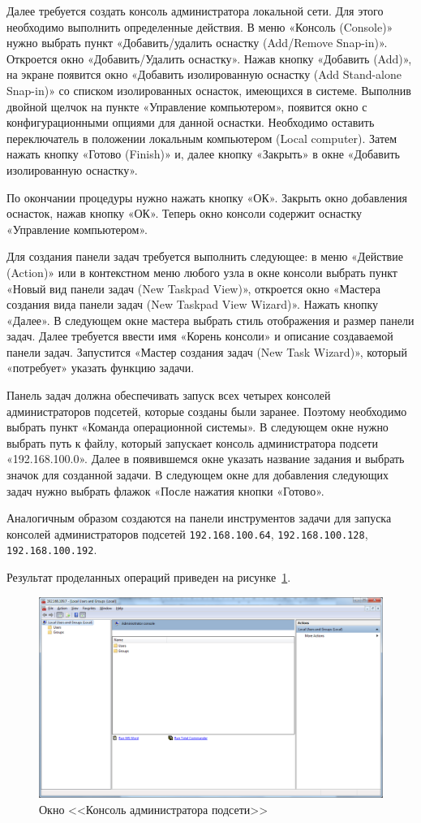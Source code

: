 Далее требуется создать консоль администратора локальной сети.
Для этого необходимо выполнить определенные действия. В меню «Консоль (Console)»
нужно выбрать пункт «Добавить/удалить оснастку (Add/Remove Snap-in)».
Откроется окно «Добавить/Удалить оснастку». Нажав кнопку «Добавить (Add)»,
на экране появится окно «Добавить изолированную
оснастку (Add Stand-alone Snap-in)» со списком изолированных оснасток, имеющихся в системе.
Выполнив двойной щелчок на пункте «Управление компьютером»,
появится окно с конфигурационными опциями для данной оснастки.
Необходимо оставить переключатель в положении локальным компьютером (Local computer).
Затем нажать кнопку «Готово (Finish)» и, далее кнопку «Закрыть» в
окне «Добавить изолированную оснастку».

По окончании процедуры нужно нажать кнопку «ОК». Закрыть окно добавления оснасток,
нажав кнопку «ОК». Теперь окно консоли содержит оснастку «Управление компьютером».

Для создания панели задач требуется выполнить следующее: в меню «Действие (Action)»
или в контекстном меню любого узла в окне консоли выбрать пункт
«Новый вид панели задач (New Taskpad View)», откроется окно «Мастера создания
вида панели задач (New Taskpad View Wizard)». Нажать кнопку «Далее».
В следующем окне мастера выбрать стиль отображения и размер панели задач.
Далее  требуется ввести имя «Корень консоли» и описание создаваемой панели задач.
Запустится «Мастер создания задач (New Task Wizard)»,
который «потребует» указать функцию задачи.

Панель задач должна обеспечивать запуск всех четырех консолей администраторов подсетей,
которые созданы были заранее. Поэтому необходимо выбрать пункт «Команда операционной системы».
В следующем окне нужно выбрать путь к файлу, который запускает
консоль администратора подсети «192.168.100.0».
Далее в появившемся окне указать название задания и выбрать значок для созданной задачи.
В следующем окне для добавления следующих задач нужно выбрать флажок «После нажатия кнопки «Готово».

Аналогичным образом создаются на панели инструментов задачи для запуска
консолей администраторов подсетей \texttt{192.168.100.64}, \texttt{192.168.100.128},
\texttt{192.168.100.192}.

Результат проделанных операций приведен на рисунке~\ref{pic:results}.
\begin{figure}[h!]
  \centering
  \includegraphics[width=0.8\linewidth]{pic/results}
  \caption{Окно <<Консоль администратора подсети>>}
  \label{pic:results}
\end{figure}
